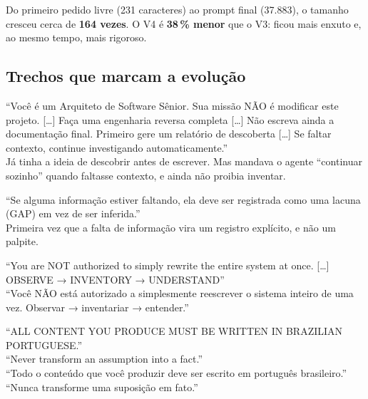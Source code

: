 Do primeiro pedido livre (231 caracteres) ao prompt final (37.883), o tamanho cresceu cerca de \textbf{164 vezes}. O V4 é \textbf{38\,\% menor} que o V3: ficou mais enxuto e, ao mesmo tempo, mais rigoroso.

\subsection{Trechos que marcam a evolução}

\begin{analogia}[V0 — 13/07, português]
\enquote{Você é um Arquiteto de Software Sênior. Sua missão NÃO é modificar este projeto. [\ldots] Faça uma engenharia reversa completa [\ldots] Não escreva ainda a documentação final. Primeiro gere um relatório de descoberta [\ldots] Se faltar contexto, continue investigando automaticamente.}\\[3pt]
\footnotesize Já tinha a ideia de descobrir antes de escrever. Mas mandava o agente \enquote{continuar sozinho} quando faltasse contexto, e ainda não proibia inventar.
\end{analogia}

\begin{analogia}[V1 — 24/07, português]
\enquote{Se alguma informação estiver faltando, ela deve ser registrada como uma lacuna (GAP) em vez de ser inferida.}\\[3pt]
\footnotesize Primeira vez que a falta de informação vira um registro explícito, e não um palpite.
\end{analogia}

\begin{analogia}[V3 — 14/09, inglês]
\enquote{You are NOT authorized to simply rewrite the entire system at once. [\ldots] OBSERVE → INVENTORY → UNDERSTAND}\\[3pt]
\footnotesize \enquote{Você NÃO está autorizado a simplesmente reescrever o sistema inteiro de uma vez. Observar → inventariar → entender.}
\end{analogia}

\begin{analogia}[V4 — 15/09, inglês]
\enquote{ALL CONTENT YOU PRODUCE MUST BE WRITTEN IN BRAZILIAN PORTUGUESE.}\\[2pt]
\enquote{Never transform an assumption into a fact.}\\[3pt]
\footnotesize \enquote{Todo o conteúdo que você produzir deve ser escrito em português brasileiro.} \enquote{Nunca transforme uma suposição em fato.}
\end{analogia}

